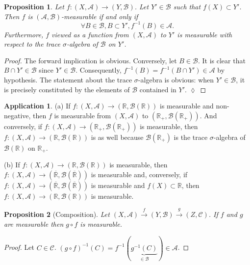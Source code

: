 \documentclass[11pt]{article}
\newtheorem{proposition}{Proposition}[section]
\theoremstyle{definition}
\newtheorem{application}{Application}[section]
\begin{document}
\begin{proposition}
Let $f : (X, \mathscr{A}) \to (Y, \mathscr{B})$. Let $Y' \in \mathscr{B}$ such that $f(X) \subset Y'$. Then $f$ is $(\mathscr{A}, \mathscr{B})$-measurable if and only if
$$ \forall B \in \mathscr{B}, B \subset Y', f^{-1}(B) \in \mathscr{A}. $$
Furthermore, $f$ viewed as a function from $(X, \mathscr{A})$ to $Y'$ is measurable with respect to the trace $\sigma$-algebra of $\mathscr{B}$ on $Y'$.
\end{proposition}
\begin{proof}
    The forward implication is obvious.
    Conversely, let $B \in \mathscr{B}$. It is clear that $B \cap Y' \in \mathscr{B}$ since $Y' \in \mathscr{B}$. Consequently, $f^{-1}(B) = f^{-1}(B \cap Y') \in \mathscr{A}$ by hypothesis. The statement about the trace $\sigma$-algebra is obvious: when $Y' \in \mathscr{B}$, it is precisely constituted by the elements of $\mathscr{B}$ contained in $Y'$. $\lozenge$
\end{proof}

\begin{application}
    (a) If $f : (X, \mathscr{A}) \to (\mathbb{R}, \mathscr{B}(\mathbb{R}))$ is measurable and non-negative, then $f$ is measurable from $(X, \mathscr{A})$ to $(\mathbb{R}_+, \mathscr{B}(\mathbb{R}_+))$. And conversely, if $f : (X, \mathscr{A}) \to (\mathbb{R}_+, \mathscr{B}(\mathbb{R}_+))$ is measurable, then $f : (X, \mathscr{A}) \to (\mathbb{R}, \mathscr{B}(\mathbb{R}))$ is as well because $\mathscr{B}(\mathbb{R}_+)$ is the trace $\sigma$-algebra of $\mathscr{B}(\mathbb{R})$ on $\mathbb{R}_+$.

(b) If $f : (X, \mathscr{A}) \to (\mathbb{R}, \mathscr{B}(\mathbb{R}))$ is measurable, then $f : (X, \mathscr{A}) \to (\overline{\mathbb{R}}, \mathscr{B}(\overline{\mathbb{R}}))$ is measurable and, conversely, if $f : (X, \mathscr{A}) \to (\overline{\mathbb{R}}, \mathscr{B}(\overline{\mathbb{R}}))$ is measurable and $f(X) \subset \mathbb{R}$, then $f : (X, \mathscr{A}) \to (\mathbb{R}, \mathscr{B}(\mathbb{R}))$ is measurable.
\end{application}

\begin{proposition}[Composition]
    Let $(X, \mathscr{A}) \xrightarrow{f} (Y, \mathscr{B}) \xrightarrow{g} (Z, \mathscr{C})$. If $f$ and $g$ are measurable then $g \circ f$ is measurable.
\end{proposition}
\begin{proof}
	Let $C \in \mathscr{C}$. $(g \circ f)^{-1}(C) = f^{-1}(\underbrace{g^{-1}(C)}_{\in \mathscr{B}}) \in \mathscr{A}$. 
\end{proof}
\end{document}
